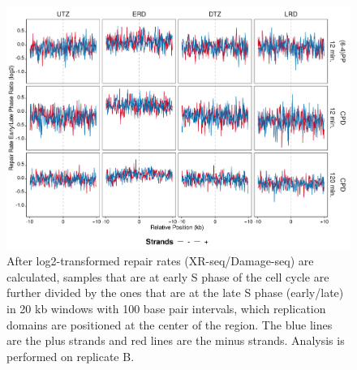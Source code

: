 \begin{figure}[H]
\begin{center}
\includegraphics[width=\textwidth]{Chapters/7_appendix/figures/supfig25}
\caption[Repair rate early/late phase ratio of replication domains in 20 kb (replicate B).]{After log2-transformed repair rates (XR-seq/Damage-seq) are calculated, samples that are at early S phase of the cell cycle are further divided by the ones that are at the late S phase (early/late) in 20 kb windows with 100 base pair intervals, which replication domains are positioned at the center of the region. The blue lines are the plus strands and red lines are the minus strands. Analysis is performed on replicate B.}
\label{supfig:rrel20repdomainB}
\end{center}
\end{figure}

